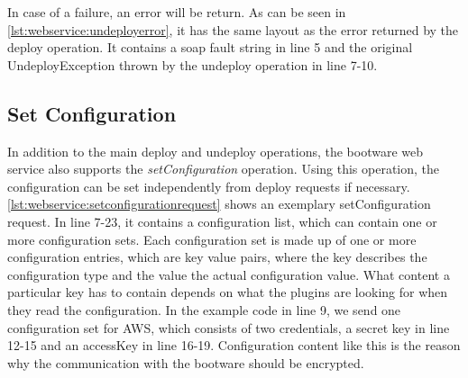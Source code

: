 \vspace*{\baselineskip}

In case of a failure, an error will be return.
As can be seen in \autoref{lst:webservice:undeployerror}, it has the same layout as the error returned by the deploy operation.
It contains a soap fault string in line 5 and the original UndeployException thrown by the undeploy operation in line 7-10.

\vspace*{\baselineskip}

\subsection{Set Configuration}

In addition to the main deploy and undeploy operations, the bootware web service also supports the \textit{setConfiguration} operation.
Using this operation, the configuration can be set independently from deploy requests if necessary.
\autoref{lst:webservice:setconfigurationrequest} shows an exemplary setConfiguration request.
In line 7-23, it contains a configuration list, which can contain one or more configuration sets.
Each configuration set is made up of one or more configuration entries, which are key value pairs, where the key describes the configuration type and the value the actual configuration value.
What content a particular key has to contain depends on what the plugins are looking for when they read the configuration.
In the example code in line 9, we send one configuration set for AWS, which consists of two credentials, a secret key in line 12-15 and an accessKey in line 16-19.
Configuration content like this is the reason why the communication with the bootware should be encrypted.

